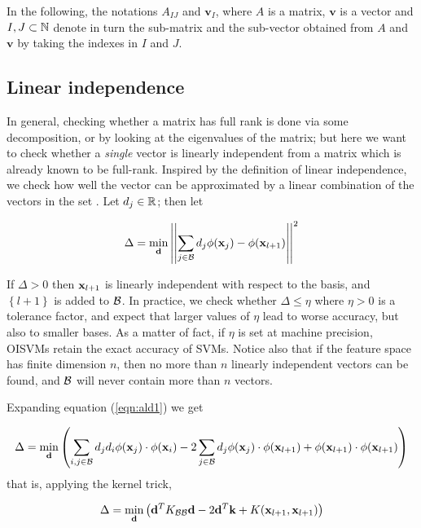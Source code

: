 In the following, the notations $A_{IJ}$ and $\mathbf{v}_I$, where $A$
is a matrix, $\mathbf{v}$ is a vector and $I,J \subset \mathbb{N}$ denote in
turn the sub-matrix and the sub-vector obtained from $A$ and
$\mathbf{v}$ by taking the indexes in $I$ and $J$.

\subsection{Linear independence}

In general, checking whether a matrix has full rank is done via some
decomposition, or by looking at the eigenvalues of the matrix; but
here we want to check whether a \emph{single} vector is linearly
independent from a matrix which is already known to be
full-rank. Inspired by the definition of linear independence, we check
how well the vector can be approximated by a linear combination of the
vectors in the set \cite{EngelMM02sparse}. Let $d_j \in \mathbb{R}$; then let

\begin{equation} \label{eqn:ald1}
  \Delta = \min_{\mathbf{d}} \left|\left|\sum_{j \in \mathcal{B}} d_j \phi(\mathbf{x}_j) - \phi(\mathbf{x}_{l+1}) \right|\right|^2
\end{equation}

If $\Delta > 0$ then $\mathbf{x}_{l+1}$ is linearly independent with respect
to the basis, and $\left\{l+1\right\}$ is added to $\mathcal{B}$. In practice, we check
whether $\Delta \leq \eta$ where $\eta > 0$ is a tolerance factor, and
expect that larger values of $\eta$ lead to worse accuracy, but also
to smaller bases. As a matter of fact, if $\eta$ is set at machine
precision, OISVMs retain the exact accuracy of SVMs. Notice also that
if the feature space has finite dimension $n$, then no more than $n$
linearly independent vectors can be found, and $\mathcal{B}$ will never contain
more than $n$ vectors.

Expanding equation (\ref{eqn:ald1}) we get

\begin{equation} \label{eqn:ald2}
  \Delta = \min_{\mathbf{d}} \left( \sum_{i,j \in \mathcal{B}} d_j d_i \phi(\mathbf{x}_j) \cdot \phi(\mathbf{x}_i) 
    - 2\sum_{j \in \mathcal{B}} d_j \phi(\mathbf{x}_j) \cdot \phi(\mathbf{x}_{l+1})
    + \phi(\mathbf{x}_{l+1}) \cdot \phi(\mathbf{x}_{l+1}) \right)
\end{equation}
\noindent that is, applying the kernel trick,

\begin{equation} \label{eqn:ald3}
  \Delta = \min_{\mathbf{d}} \left(
      \mathbf{d}^T K_{\mathcal{B}\mathcal{B}}\mathbf{d}
    - 2 \mathbf{d}^T \mathbf{k}
    + K(\mathbf{x}_{l+1},\mathbf{x}_{l+1})
  \right)
\end{equation}

